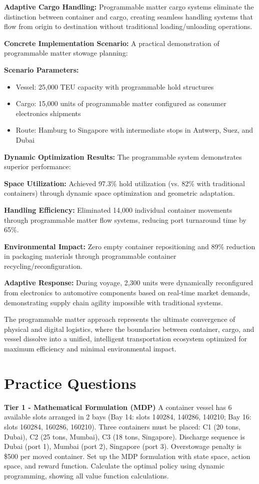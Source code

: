\documentclass{article}
\begin{document}
\textbf{Adaptive Cargo Handling:} Programmable matter cargo systems eliminate the distinction between container and cargo, creating seamless handling systems that flow from origin to destination without traditional loading/unloading operations.

\textbf{Concrete Implementation Scenario:}
A practical demonstration of programmable matter stowage planning:

\textbf{Scenario Parameters:}
\begin{itemize}
\item Vessel: 25,000 TEU capacity with programmable hold structures
\item Cargo: 15,000 units of programmable matter configured as consumer electronics shipments
\item Route: Hamburg to Singapore with intermediate stops in Antwerp, Suez, and Dubai
\end{itemize}

\textbf{Dynamic Optimization Results:}
The programmable system demonstrates superior performance:

\textbf{Space Utilization:} Achieved 97.3\% hold utilization (vs. 82\% with traditional containers) through dynamic space optimization and geometric adaptation.

\textbf{Handling Efficiency:} Eliminated 14,000 individual container movements through programmable matter flow systems, reducing port turnaround time by 65\%.

\textbf{Environmental Impact:} Zero empty container repositioning and 89\% reduction in packaging materials through programmable container recycling/reconfiguration.

\textbf{Adaptive Response:} During voyage, 2,300 units were dynamically reconfigured from electronics to automotive components based on real-time market demands, demonstrating supply chain agility impossible with traditional systems.

The programmable matter approach represents the ultimate convergence of physical and digital logistics, where the boundaries between container, cargo, and vessel dissolve into a unified, intelligent transportation ecosystem optimized for maximum efficiency and minimal environmental impact.

\section{Practice Questions}

\textbf{Tier 1 - Mathematical Formulation (MDP)}
A container vessel has 6 available slots arranged in 2 bays (Bay 14: slots 140284, 140286, 140210; Bay 16: slots 160284, 160286, 160210). Three containers must be placed: C1 (20 tons, Dubai), C2 (25 tons, Mumbai), C3 (18 tons, Singapore). Discharge sequence is Dubai (port 1), Mumbai (port 2), Singapore (port 3). Overstowage penalty is \$500 per moved container. Set up the MDP formulation with state space, action space, and reward function. Calculate the optimal policy using dynamic programming, showing all value function calculations.
\end{document}

